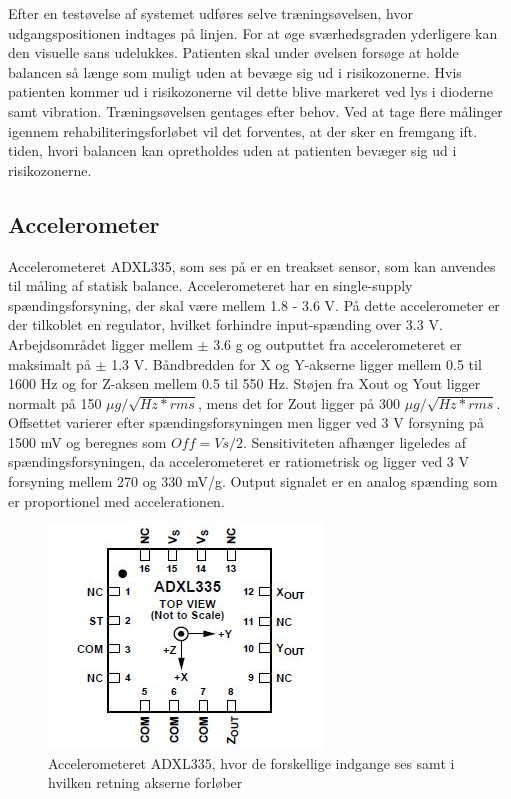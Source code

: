 Efter en testøvelse af systemet udføres selve træningsøvelsen, hvor udgangspositionen indtages på linjen. For at øge sværhedsgraden yderligere kan den visuelle sans udelukkes. Patienten skal under øvelsen forsøge at holde balancen så længe som muligt uden at bevæge sig ud i risikozonerne. Hvis patienten kommer ud i risikozonerne vil dette blive markeret ved lys i dioderne samt vibration. Træningsøvelsen gentages efter behov. Ved at tage flere målinger igennem rehabiliteringsforløbet vil det forventes, at der sker en fremgang ift. tiden, hvori balancen kan opretholdes uden at patienten bevæger sig ud i risikozonerne. 

\subsection{Accelerometer}
Accelerometeret ADXL335, som ses på  er en treakset sensor, som kan anvendes til måling af statisk balance. Accelerometeret har en single-supply spændingsforsyning, der skal være mellem 1.8 - 3.6 V. På dette accelerometer er der tilkoblet en regulator, hvilket forhindre input-spænding over 3.3 V.  Arbejdsområdet ligger mellem $\pm$ 3.6 g og outputtet fra accelerometeret er maksimalt på $\pm$ 1.3 V. Båndbredden for X og Y-akserne ligger mellem 0.5 til 1600 Hz og for Z-aksen mellem 0.5 til 550 Hz. Støjen fra Xout og Yout ligger normalt på 150 $\mu g/\sqrt{Hz * rms}$, mens det for Zout ligger på 300 $\mu g/\sqrt{Hz * rms}$. Offsettet varierer efter spændingsforsyningen men ligger ved 3 V forsyning på 1500 mV og beregnes som $ Off = Vs/2$.  Sensitiviteten afhænger ligeledes af spændingsforsyningen, da accelerometeret er ratiometrisk og ligger ved 3 V forsyning mellem 270 og 330 mV/g. Output signalet er en analog spænding som er proportionel med accelerationen. %

\begin{figure}[H]
	\centering 
	\includegraphics[scale=0.9]{figures/cProblemloesning/ADXL335.JPG}
	\caption{Accelerometeret ADXL335, hvor de forskellige indgange ses samt i hvilken retning akserne forløber}
	\label{ADXL335}
\end{figure}

